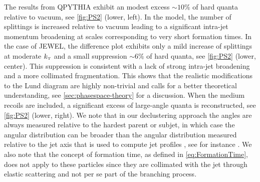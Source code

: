 The results from QPYTHIA exhibit an modest excess $\sim 10\%$ of hard quanta relative to vacuum, see \autoref{fig:PS2} (lower, left). In the model, the number of splittings is increased relative to vacuum leading to a significant intra-jet momentum broadening at scales corresponding to very short formation times.
In the case of JEWEL, the difference plot exhibits only a mild increase of splittings at moderate $k_{\text{\tiny T}}$ and a small suppression $\sim 6\%$ of hard quanta, see \autoref{fig:PS2} (lower, center). This suppression is consistent with a lack of strong intra-jet broadening and a more collimated fragmentation. 
This shows that the realistic modifications to the Lund diagram are highly non-trivial and calls for a better theoretical understanding, see \autoref{sec:phasespace-theory} for a discussion.
When the medium recoils are included, a significant excess of large-angle quanta is reconstructed, see \autoref{fig:PS2} (lower, right). 
We note that in our declustering approach the angles are always measured relative to the hardest parent or subjet, in which case the angular distribution can be broader than the angular distribution measured relative to the jet axis that is used to compute jet profiles , see for instance \cite{KunnawalkamElayavalli:2017hxo}.
We also note that the concept of formation time, as defined in \eqref{eq:FormationTime}, does not apply to these particles since they are collimated with the jet through elastic scattering and not per se part of the branching process.


